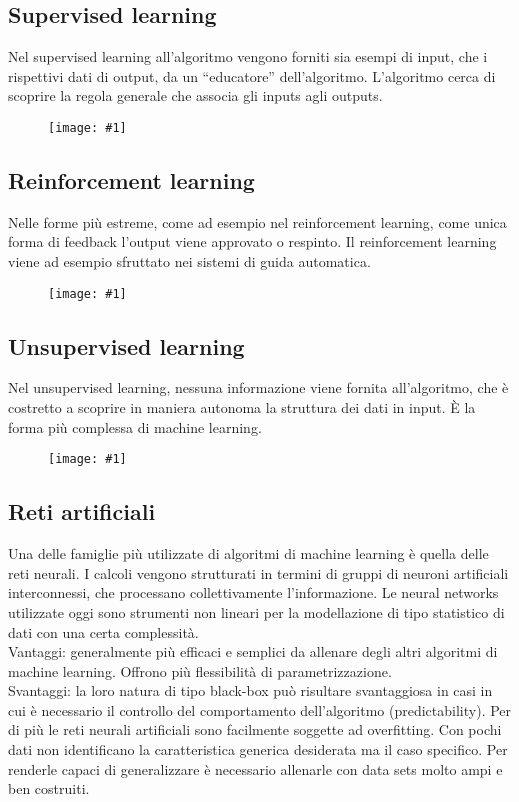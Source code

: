 \documentclass[8pt,a4paper]{article}
\newcommand{\f}[1]{
      \begin{figure}[H]
        \center
      \texttt{[image: \#1]}
      \end{figure}
}
\begin{document}
\begin{multicols}{5}
    \subsection{Supervised learning}
    Nel supervised learning all’algoritmo vengono forniti sia esempi di input, che i
    rispettivi dati di output, da un “educatore” dell’algoritmo. L’algoritmo cerca di
    scoprire la regola generale che associa gli inputs agli outputs.
    \f{SupervisedLearning}
    
    \subsection{Reinforcement learning}
    Nelle forme più estreme, come ad esempio nel reinforcement learning, come unica
    forma di feedback l’output viene approvato o respinto. Il reinforcement learning
    viene ad esempio sfruttato nei sistemi di guida automatica.
    \f{ReinforcementLearning}
    
    \subsection{Unsupervised learning}
    Nel unsupervised learning, nessuna informazione viene fornita all’algoritmo, che
    è costretto a scoprire in maniera autonoma la struttura dei dati in input. È la
    forma più complessa di machine learning.
    \f{UnsupervisedLearning}
    
    \subsection{Reti artificiali}
    Una delle famiglie più utilizzate di algoritmi di machine learning è quella delle
    reti neurali. I calcoli vengono strutturati in termini di gruppi di neuroni artificiali
    interconnessi, che processano collettivamente l’informazione. Le neural networks
    utilizzate oggi sono strumenti non lineari per la modellazione di tipo statistico
    di dati con una certa complessità.\\
    Vantaggi: generalmente più efficaci e semplici da allenare degli altri algoritmi
    di machine learning. Offrono più flessibilità di parametrizzazione.\\
    Svantaggi: la loro natura di tipo black-box può risultare svantaggiosa in casi in cui
    è necessario il controllo del comportamento dell’algoritmo (predictability). Per di
    più le reti neurali artificiali sono facilmente soggette ad overfitting. Con pochi dati
    non identificano la caratteristica generica desiderata ma il caso specifico.
    Per renderle capaci di generalizzare è necessario allenarle con data sets molto ampi e ben costruiti.
    

\end{multicols}
\end{document}
